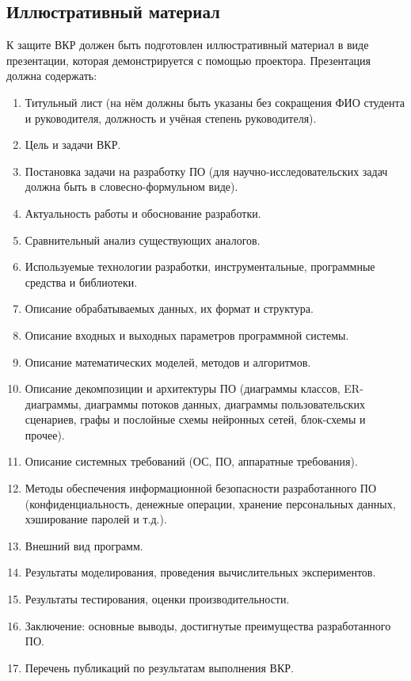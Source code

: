 \documentclass[14pt]{extarticle}
\begin{document}
\subsection{Иллюстративный материал}
К защите ВКР должен быть подготовлен иллюстративный материал в виде презентации, которая демонстрируется с помощью проектора. Презентация должна содержать:
\begin{enumerate}[label=\arabic*.]
	\item Титульный лист (на нём должны быть указаны без сокращения ФИО студента и руководителя, должность и учёная степень руководителя).
	\item Цель и задачи ВКР.
	\item Постановка задачи на разработку ПО (для научно-исследовательских задач должна быть в словесно-формульном виде).
	\item Актуальность работы и обоснование разработки.
	\item Сравнительный анализ существующих аналогов.
	\item Используемые технологии разработки, инструментальные, программные средства и библиотеки.
	\item Описание обрабатываемых данных, их формат и структура.
	\item Описание входных и выходных параметров программной системы.
	\item Описание математических моделей, методов и алгоритмов.
	\item Описание декомпозиции и архитектуры ПО (диаграммы классов, ER-диаг\-раммы, диаграммы потоков данных, диаграммы пользовательских сценариев, графы и послойные схемы нейронных сетей, блок-схемы и прочее).
	\item Описание системных требований (ОС, ПО, аппаратные требования).
	\item Методы обеспечения информационной безопасности разработанного ПО (конфиденциальность, денежные операции, хранение персональных данных, хэширование паролей и т.д.).
	\item Внешний вид программ.
	\item Результаты моделирования, проведения вычислительных экспериментов.
	\item Результаты тестирования, оценки производительности.
	\item Заключение: основные выводы, достигнутые преимущества разработанного ПО.
	\item Перечень публикаций по результатам выполнения ВКР.
\end{enumerate}
\end{document}
